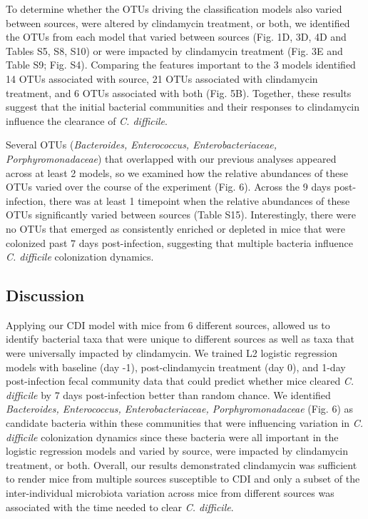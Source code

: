 \documentclass[
  11pt,
]{article}
\begin{document}
To determine whether the OTUs driving the classification models also
varied between sources, were altered by clindamycin treatment, or both,
we identified the OTUs from each model that varied between sources (Fig.
1D, 3D, 4D and Tables S5, S8, S10) or were impacted by clindamycin
treatment (Fig. 3E and Table S9; Fig. S4). Comparing the features
important to the 3 models identified 14 OTUs associated with source, 21
OTUs associated with clindamycin treatment, and 6 OTUs associated with
both (Fig. 5B). Together, these results suggest that the initial
bacterial communities and their responses to clindamycin influence the
clearance of \emph{C. difficile}.

Several OTUs (\emph{Bacteroides, Enterococcus, Enterobacteriaceae,
Porphyromonadaceae}) that overlapped with our previous analyses appeared
across at least 2 models, so we examined how the relative abundances of
these OTUs varied over the course of the experiment (Fig. 6). Across the
9 days post-infection, there was at least 1 timepoint when the relative
abundances of these OTUs significantly varied between sources (Table
S15). Interestingly, there were no OTUs that emerged as consistently
enriched or depleted in mice that were colonized past 7 days
post-infection, suggesting that multiple bacteria influence \emph{C.
difficile} colonization dynamics.

\hypertarget{discussion}{%
\subsection{Discussion}\label{discussion}}

Applying our CDI model with mice from 6 different sources, allowed us to
identify bacterial taxa that were unique to different sources as well as
taxa that were universally impacted by clindamycin. We trained L2
logistic regression models with baseline (day -1), post-clindamycin
treatment (day 0), and 1-day post-infection fecal community data that
could predict whether mice cleared \emph{C. difficile} by 7 days
post-infection better than random chance. We identified
\emph{Bacteroides, Enterococcus, Enterobacteriaceae, Porphyromonadaceae}
(Fig. 6) as candidate bacteria within these communities that were
influencing variation in \emph{C. difficile} colonization dynamics since
these bacteria were all important in the logistic regression models and
varied by source, were impacted by clindamycin treatment, or both.
Overall, our results demonstrated clindamycin was sufficient to render
mice from multiple sources susceptible to CDI and only a subset of the
inter-individual microbiota variation across mice from different sources
was associated with the time needed to clear \emph{C. difficile}.
\end{document}
